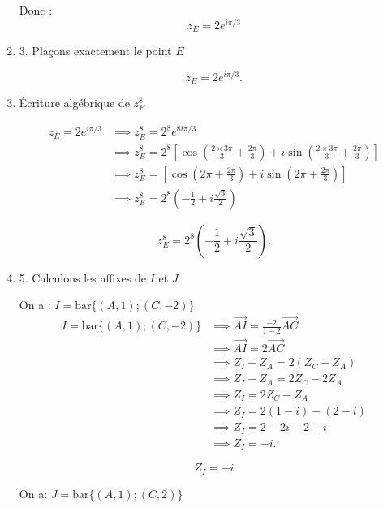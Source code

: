 \documentclass[12pt,a4paper]{article}
\begin{document}
\begin{enumerate}
Donc :
\[ \boxed{z_E = 2 e^{i\pi/3}} \]

\item 3. Plaçons exactement le point $E$

\[
z_E = 2 e^{i\pi/3}.
\]

\item Écriture algébrique de $z_E^8$

\begin{align*}
z_E = 2 e^{i\pi/3} &\implies z_E^8 = 2^8 e^{8i\pi/3}\\
                   &\implies z_E^8=2^8 \left[\cos\left(\frac{2\times 3\pi}{3}+\frac{2\pi}{3}\right) + i\sin\left(\frac{2\times 3\pi}{3}+\frac{2\pi}{3}\right)\right]\\
										&\implies z_E^8=\left[\cos\left(2\pi+\frac{2\pi}{3}\right) + i\sin\left(2\pi+\frac{2\pi}{3}\right)\right]\\
										&\implies z_E^8 = 2^8 \left(-\frac{1}{2} + i\frac{\sqrt{3}}{2}\right)
\end{align*}

\[
\boxed{z_E^8 = 2^8 \left(-\frac{1}{2} + i\frac{\sqrt{3}}{2}\right)}.
\]

\item 5. Calculons les affixes de $I$ et $J$

On a : $ I = \text{bar}\{(A,1); (C,-2)\} $
\begin{align*}
I = \text{bar}\{(A,1); (C,-2)\} &\implies \overrightarrow{AI} = \frac{-2}{1-2} \overrightarrow{AC}\\
                                &\implies \overrightarrow{AI} = 2 \overrightarrow{AC}\\
                                &\implies Z_I - Z_A = 2 (Z_C - Z_A)\\
                                &\implies Z_I - Z_A = 2Z_C - 2Z_A\\
                                &\implies Z_I = 2Z_C - Z_A\\
                                &\implies Z_I = 2 (1 - i) - (2 - i)\\
                                &\implies Z_I = 2 - 2i - 2 + i\\
                                &\implies Z_I = -i.
\end{align*}

\[
\boxed{Z_I = -i}
\]


On a: $ J = \text{bar}\{(A,1); (C,2)\} $


\end{enumerate}
\end{document}
